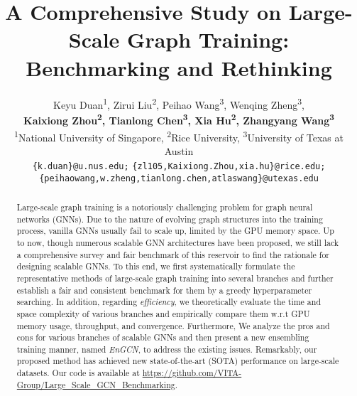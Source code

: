 \message{ !name(main.tex)}\documentclass{article}
\title{A Comprehensive Study on Large-Scale Graph Training: Benchmarking and Rethinking}
\author{Keyu Duan\textsuperscript{1}, Zirui Liu\textsuperscript{2}, Peihao Wang\textsuperscript{3}, Wenqing Zheng\textsuperscript{3}, \\ \textbf{Kaixiong Zhou\textsuperscript{2}, Tianlong Chen\textsuperscript{3}, Xia Hu\textsuperscript{2}, Zhangyang  Wang\textsuperscript{3}} \\
\textsuperscript{1}National University of Singapore, \textsuperscript{2}Rice University, \textsuperscript{3}University of Texas at Austin \\
    \small{\texttt{\{k.duan\}@u.nus.edu;}}
	\small{\texttt{\{zl105,Kaixiong.Zhou,xia.hu\}@rice.edu;}}  \\
	\small{\texttt{\{peihaowang,w.zheng,tianlong.chen,atlaswang\}@utexas.edu}}
}
\begin{document}


\maketitle
\vspace{-5mm}
\begin{abstract}
	Large-scale graph training is a notoriously challenging problem for graph neural networks (GNNs). Due to the nature of evolving graph structures into the training process, vanilla GNNs usually fail to scale up, limited by the GPU memory space. Up to now, though numerous scalable GNN architectures have been proposed, we still lack a comprehensive survey and fair benchmark of this reservoir to find the rationale for designing scalable GNNs. To this end, we first systematically formulate the representative methods of large-scale graph training into several branches and further establish a fair and consistent benchmark for them by a greedy hyperparameter searching. In addition, regarding \textit{efficiency}, we theoretically evaluate the time and space complexity of various branches and empirically compare them w.r.t GPU memory usage, throughput, and convergence. Furthermore, We analyze the pros and cons for various branches of scalable GNNs and then present a new ensembling training manner, named \textit{EnGCN}, to address the existing issues. Remarkably, our proposed method has achieved new state-of-the-art (SOTA) performance on large-scale datasets. Our code is available at \url{https://github.com/VITA-Group/Large_Scale_GCN_Benchmarking}.
\end{abstract}
\end{document}
